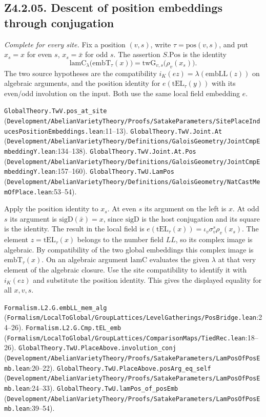 \subsection{Z4.2.05. Descent of position embeddings through conjugation}
\label{r5:small:Z4.2.05}
\textit{Complete for every site.} Fix a position $(v,s)$, write $\tau=\mathrm{pos}(v,s)$, and put $x_s=x$ for even $s$, $x_s=\bar x$ for odd $s$. The assertion $S.\mathrm{Pos}$ is the identity
\[
  \mathrm{lamC}_{\lambda}\bigl(\mathrm{embT}_{\tau}(x)\bigr)
     =\mathrm{twG}_{v,s}\bigl(\rho_v(x_s)\bigr).
\]
The two source hypotheses are the compatibility $i_K(ez)=\lambda(\mathrm{embLL}(z))$ on algebraic arguments, and the position identity for $e(\mathrm{tEL}_{\tau}(y))$ with its even/odd involution on the input. Both use the same local field embedding $e$.
\par{\footnotesize \nolinkurl{GlobalTheory.TwV.pos_at_site} (\nolinkurl{Development/AbelianVarietyTheory/Proofs/SatakeParameters/SitePlaceInducesPositionEmbeddings.lean}\allowbreak:11--13). \nolinkurl{GlobalTheory.TwV.Joint.At} (\nolinkurl{Development/AbelianVarietyTheory/Definitions/GaloisGeometry/JointCmpEmbeddingY.lean}\allowbreak:134--138). \nolinkurl{GlobalTheory.TwV.Joint.At.Pos} (\nolinkurl{Development/AbelianVarietyTheory/Definitions/GaloisGeometry/JointCmpEmbeddingY.lean}\allowbreak:157--160). \nolinkurl{GlobalTheory.TwU.LamPos} (\nolinkurl{Development/AbelianVarietyTheory/Definitions/GaloisGeometry/NatCastMemOfPlace.lean}\allowbreak:53--54).\par}

Apply the position identity to $x_s$. At even $s$ its argument on the left is $x$. At odd $s$ its argument is $\mathrm{sigD}(\bar x)=x$, since $\mathrm{sigD}$ is the host conjugation and its square is the identity. The result in the local field is $e(\mathrm{tEL}_{\tau}(x))=\iota_v\sigma_v^s\rho_v(x_s)$. The element $z=\mathrm{tEL}_{\tau}(x)$ belongs to the number field $LL$, so its complex image is algebraic. By compatibility of the two global embeddings this complex image is $\mathrm{embT}_{\tau}(x)$. On an algebraic argument $\mathrm{lamC}$ evaluates the given $\lambda$ at that very element of the algebraic closure. Use the site compatibility to identify it with $i_K(ez)$ and substitute the position identity. This gives the displayed equality for all $x,v,s$.
\par{\footnotesize \nolinkurl{Formalism.L2.G.embLL_mem_alg} (\nolinkurl{Formalism/LocalToGlobal/GroupLattices/LevelGatherings/PosBridge.lean}\allowbreak:24--26). \nolinkurl{Formalism.L2.G.Cmp.tEL_emb} (\nolinkurl{Formalism/LocalToGlobal/GroupLattices/ComparisonMaps/TiedRec.lean}\allowbreak:18--26). \nolinkurl{GlobalTheory.TwU.PlaceAbove.involution_conj} (\nolinkurl{Development/AbelianVarietyTheory/Proofs/SatakeParameters/LamPosOfPosEmb.lean}\allowbreak:20--22). \nolinkurl{GlobalTheory.TwU.PlaceAbove.posArg_eq_self} (\nolinkurl{Development/AbelianVarietyTheory/Proofs/SatakeParameters/LamPosOfPosEmb.lean}\allowbreak:24--33). \nolinkurl{GlobalTheory.TwU.lamPos_of_posEmb} (\nolinkurl{Development/AbelianVarietyTheory/Proofs/SatakeParameters/LamPosOfPosEmb.lean}\allowbreak:39--54).\par}

